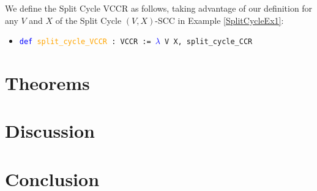 \documentclass[runningheads]{llncs}
\begin{document}
\begin{example} We define the Split Cycle VCCR as follows, taking advantage of our definition for any $V$ and $X$ of the Split Cycle $(V,X)$-SCC in Example \ref{SplitCycleEx1}:
\begin{itemize}
\item[] \texttt{\textcolor{blue}{def} \textcolor{orange}{split\_cycle\_VCCR} : VCCR := \textcolor{blue}{$\lambda$} V X, split\_cycle\_CCR}
\end{itemize}
\end{example}

\section{Theorems}\label{Theorems}

\section{Discussion}

\section{Conclusion}\label{Conclusion}
\end{document}
